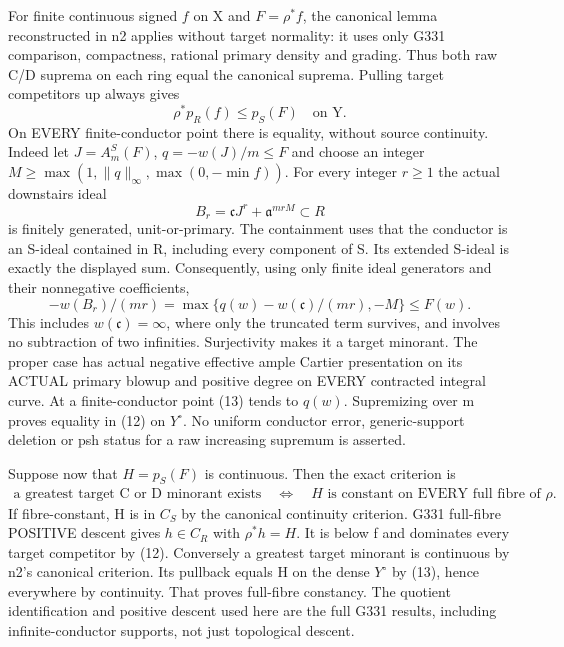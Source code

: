 \documentclass[11pt]{article}
\begin{document}
For finite continuous signed $f$ on X and $F=\rho^*f$, the canonical
lemma reconstructed in n2 applies without target normality: it uses only
G331 comparison, compactness, rational primary density and grading. Thus
both raw C/D suprema on each ring equal the canonical suprema.
Pulling target competitors up always gives
\[
                 \rho^*p_R(f)\le p_S(F)\quad\text{on Y}.    \tag{12}
\]
On EVERY finite-conductor point there is equality, without source
continuity. Indeed let $J=A_m^S(F)$, $q=-w(J)/m\le F$ and choose an
integer $M\ge\max(1,\|q\|_\infty,\max(0,-\min f))$.
For every integer $r\ge1$ the actual downstairs ideal
\[
              B_r=\mathfrak c J^r+\mathfrak a^{mrM}\subset R
\]
is finitely generated, unit-or-primary. The containment uses that the
conductor is an S-ideal contained in R, including every component of S.
Its extended S-ideal is exactly the displayed sum. Consequently, using
only finite ideal generators and their nonnegative coefficients,
\[
 -w(B_r)/(mr)
       =\max\{q(w)-w(\mathfrak c)/(mr),-M\}\le F(w).        \tag{13}
\]
This includes $w(\mathfrak c)=\infty$, where only the truncated term
survives, and involves no subtraction of two infinities. Surjectivity
makes it a target minorant. The proper case has actual negative effective
ample Cartier presentation on its ACTUAL primary blowup and positive
degree on EVERY contracted integral curve. At a finite-conductor point
(13) tends to $q(w)$. Supremizing over m proves equality in (12) on
$Y^\circ$. No uniform conductor error, generic-support deletion or psh
status for a raw increasing supremum is asserted.

Suppose now that $H=p_S(F)$ is continuous. Then the exact criterion is
\[
 \begin{gathered}
 \text{a greatest target C or D minorant exists}\quad\Longleftrightarrow
 \quad H\text{ is constant on EVERY full fibre of }\rho.     \tag{14}
 \end{gathered}
\]
If fibre-constant, H is in $C_S$ by the canonical continuity criterion.
G331 full-fibre POSITIVE descent gives $h\in C_R$ with $\rho^*h=H$.
It is below f and dominates every target competitor by (12).
Conversely a greatest target minorant is continuous by n2's canonical
criterion. Its pullback equals H on the dense $Y^\circ$ by (13), hence
everywhere by continuity. That proves full-fibre constancy. The quotient
identification and positive descent used here are the full G331 results,
including infinite-conductor supports, not just topological descent.
\end{document}
